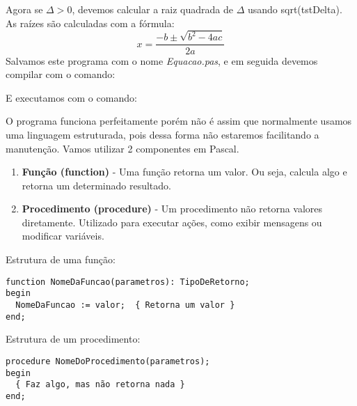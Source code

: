 Agora se $\Delta > 0$, devemos calcular a raiz quadrada de $\Delta$ usando sqrt(tstDelta). As raízes são calculadas com a fórmula:
\[
  x = \frac{-b \pm \sqrt{b^2 - 4ac}}{2a}
\]
Salvamos este programa com o nome \textit{Equacao.pas}, e em seguida devemos compilar com o comando: \\

E executamos com o comando: \\

O programa funciona perfeitamente porém não é assim que normalmente usamos uma linguagem estruturada, pois dessa forma não estaremos facilitando a manutenção. Vamos utilizar 2 componentes em Pascal. \vspace{-2em}
\begin{enumerate}
	\item \textbf{Função (function)} - Uma função retorna um valor. Ou seja, calcula algo e retorna um determinado resultado.
	\item \textbf{Procedimento (procedure)} - Um procedimento não retorna valores diretamente. Utilizado para executar ações, como exibir mensagens ou modificar variáveis.
\end{enumerate}

Estrutura de uma função:
\begin{lstlisting}[]
function NomeDaFuncao(parametros): TipoDeRetorno;
begin
  NomeDaFuncao := valor;  { Retorna um valor }
end;
\end{lstlisting}

Estrutura de um procedimento:
\begin{lstlisting}[]
procedure NomeDoProcedimento(parametros);
begin
  { Faz algo, mas não retorna nada }
end;	
\end{lstlisting}

